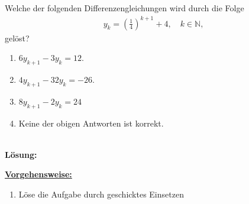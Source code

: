 \subsection*{}
Welche der folgenden Differenzengleichungen wird durch die Folge
\begin{align*}
	y_{k} = \left(\frac{1}{4}\right)^{k+1} + 4, \quad k \in \mathbb{N},
\end{align*}
gelöst?
\renewcommand{\labelenumi}{(\alph{enumi})}
\begin{enumerate}
	\item
	$ 6 y_{k+1}  - 3 y_k = 12$.
	\item
	$ 4 y_{k+1} - 32 y_k = -26 $.	
	\item 
	$ 8 y_{k+1} - 2 y_k = 24 $
	\item
	Keine der obigen Antworten ist korrekt.
\end{enumerate}
\ \\
\textbf{Lösung:}
\begin{mdframed}
\underline{\textbf{Vorgehensweise:}}
\renewcommand{\labelenumi}{\theenumi.}
\begin{enumerate}
\item Löse die Aufgabe durch geschicktes Einsetzen
\end{enumerate}
\end{mdframed}


